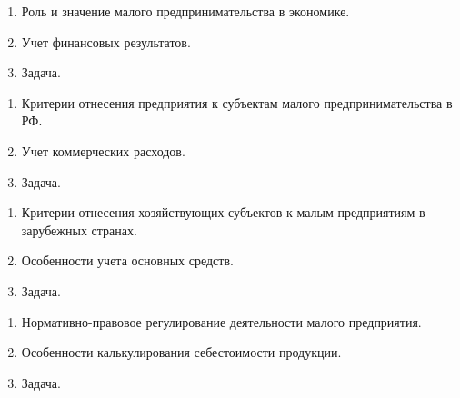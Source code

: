 


\shapkFull
\setcounter{zad}{0}

\begin{enumerate}
	\item Роль и значение малого предпринимательства в экономике.

	\item Учет финансовых результатов.

	\item Задача.
\end{enumerate}

\newpage


\shapkFull
\setcounter{zad}{0}

\begin{enumerate}
	\item Критерии отнесения предприятия к субъектам малого предпринимательства в РФ.

	\item Учет коммерческих расходов.

	\item Задача.
\end{enumerate}

\newpage


\shapkFull
\setcounter{zad}{0}

\begin{enumerate}
	\item Критерии отнесения хозяйствующих субъектов к малым предприятиям в зарубежных странах.

	\item Особенности учета основных средств.

	\item Задача.
\end{enumerate}

\newpage


\shapkFull
\setcounter{zad}{0}

\begin{enumerate}
	\item Нормативно-правовое регулирование деятельности малого предприятия.

	\item Особенности калькулирования себестоимости продукции.

	\item Задача.
\end{enumerate}

